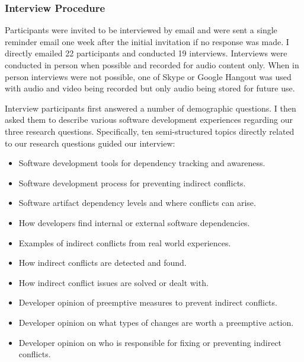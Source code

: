 \subsubsection{Interview Procedure}

Participants were invited to be interviewed by email and were sent a single reminder email one week
after the initial invitation if no response was made. I directly emailed 22 participants and  conducted
19 interviews. Interviews were conducted in person when possible and recorded for audio content only. When in person
interviews were not possible, one of Skype or Google Hangout was used with audio and video being recorded but only
audio being stored for future use. 

Interview participants first answered a number of demographic questions. I then asked them to describe various software development experiences regarding our three research questions.
Specifically, ten semi-structured  topics directly related to our research questions guided our interview: 


\begin{itemize}

\item Software development tools for dependency tracking and awareness.

\item Software development process for preventing indirect conflicts.
\item Software artifact dependency levels and where conflicts can arise.

\item How developers find internal or external software dependencies.

\item Examples of indirect conflicts from real world experiences.
\item How indirect conflicts are detected and found.

\item How indirect conflict issues are solved or dealt with.
\item Developer opinion of preemptive measures to prevent indirect conflicts.

\item Developer opinion on what types of changes are worth a preemptive action.

\item Developer opinion on who is responsible for fixing or preventing indirect conflicts.
\end{itemize}


